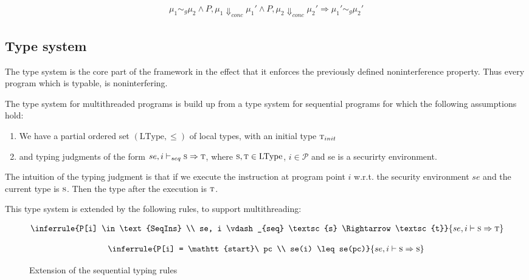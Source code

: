 \documentclass[a4paper,10pt]{llncs}
\begin{document}
\begin{align*}
\mu_1 \sim_g \mu_2 \land P,\mu_1 \Downarrow_{conc} \mu_1' \land P,\mu_2 \Downarrow_{conc} \mu_2' \Rightarrow \mu_1' \sim_g \mu_2'
\end{align*}

\subsection{Type system}
\label{sec:typesystem}
The type system is the core part of the framework in the effect that it
enforces the previously defined noninterference property. Thus every
program which is typable, is noninterfering.

The type system for multithreaded programs is build up from a type system
for sequential programs for which the following assumptions hold:

\begin{enumerate}
\item We have a partial ordered set $(\text{LType}, \leq)$ of local types, with an initial
      type $\textsc{t}_{init}$
\item and typing judgments of the form $se, i \vdash_{seq} \textsc{s} \Rightarrow \textsc{t}$, where
      $\textsc{s}, \textsc{t} \in \text{LType}$, $i \in \mathcal{P}$ and se is a securirty environment.
\end{enumerate}

The intuition of the typing judgment is that if we execute the instruction at program
point $i$ w.r.t. the security environment $se$ and the current type is $\textsc{s}$. Then the
type after the execution is $\textsc{t}$.

This type system is extended by the following rules, to support multithreading:

\begin{figure}
\begin{minipage}{.5\textwidth}
\begin{align*}
\inferrule{P[i] \in \text{SeqIns} \\ se, i \vdash_{seq} \textsc{s} \Rightarrow \textsc{t}}
{se, i \vdash \textsc{s} \Rightarrow \textsc{t}}
\end{align*}
\end{minipage}
\begin{minipage}{.5\textwidth}
\begin{align*}
\inferrule{P[i] = \mathtt{start}\ pc \\ se(i) \leq se(pc)}
{se, i \vdash \textsc{s} \Rightarrow \textsc{s}}
\end{align*}
\end{minipage}
\caption{Extension of the sequential typing rules}
\label{fig:multithreaded-typing-rules}
\end{figure}
\end{document}
